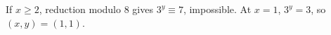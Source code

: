 If $x\ge2$, reduction modulo $8$ gives $3^y\equiv7$, impossible. At $x=1$, $3^y=3$, so $\boxed{(x,y)=(1,1)}$.
